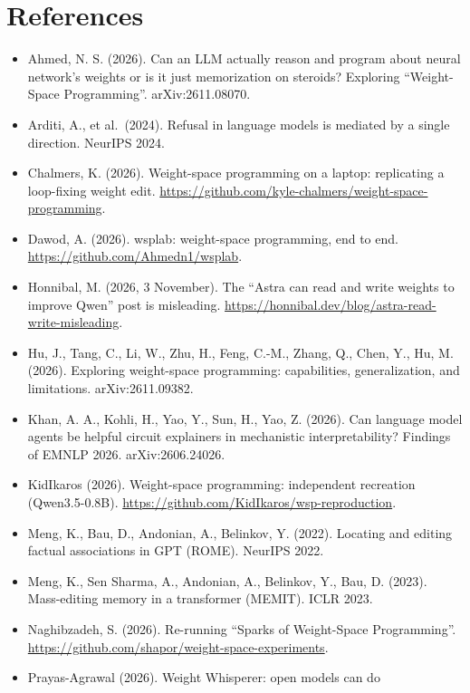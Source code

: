 \documentclass[
  10pt,
]{article}
\providecommand{\tightlist}{%
  \setlength{\itemsep}{0pt}\setlength{\parskip}{0pt}}
\begin{document}
\section{References}\label{references}

\begin{itemize}
\tightlist
\item
  Ahmed, N. S. (2026). Can an LLM actually reason and program about
  neural network's weights or is it just memorization on steroids?
  Exploring ``Weight-Space Programming''. arXiv:2611.08070.
\item
  Arditi, A., et al.~(2024). Refusal in language models is mediated by a
  single direction. NeurIPS 2024.
\item
  Chalmers, K. (2026). Weight-space programming on a laptop: replicating
  a loop-fixing weight edit.
  \url{https://github.com/kyle-chalmers/weight-space-programming}.
\item
  Dawod, A. (2026). wsplab: weight-space programming, end to end.
  \url{https://github.com/Ahmedn1/wsplab}.
\item
  Honnibal, M. (2026, 3 November). The ``Astra can read and write
  weights to improve Qwen'' post is misleading.
  \url{https://honnibal.dev/blog/astra-read-write-misleading}.
\item
  Hu, J., Tang, C., Li, W., Zhu, H., Feng, C.-M., Zhang, Q., Chen, Y.,
  Hu, M. (2026). Exploring weight-space programming: capabilities,
  generalization, and limitations. arXiv:2611.09382.
\item
  Khan, A. A., Kohli, H., Yao, Y., Sun, H., Yao, Z. (2026). Can language
  model agents be helpful circuit explainers in mechanistic
  interpretability? Findings of EMNLP 2026. arXiv:2606.24026.
\item
  KidIkaros (2026). Weight-space programming: independent recreation
  (Qwen3.5-0.8B). \url{https://github.com/KidIkaros/wsp-reproduction}.
\item
  Meng, K., Bau, D., Andonian, A., Belinkov, Y. (2022). Locating and
  editing factual associations in GPT (ROME). NeurIPS 2022.
\item
  Meng, K., Sen Sharma, A., Andonian, A., Belinkov, Y., Bau, D. (2023).
  Mass-editing memory in a transformer (MEMIT). ICLR 2023.
\item
  Naghibzadeh, S. (2026). Re-running ``Sparks of Weight-Space
  Programming''.
  \url{https://github.com/shapor/weight-space-experiments}.
\item
  Prayas-Agrawal (2026). Weight Whisperer: open models can do

\end{itemize}
\end{document}
